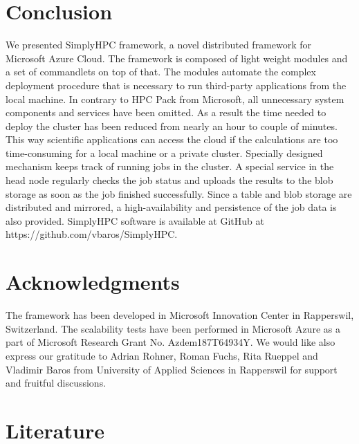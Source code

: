 \documentclass[3p,times]{elsarticle}
\begin{document}
 
\section{Conclusion}
\label{sec:conclusions}

We presented SimplyHPC framework, a novel distributed framework for Microsoft Azure Cloud. The framework is composed of light weight modules and a set of commandlets on top of that. The modules automate the complex deployment procedure that is necessary to run third-party applications from the local machine. In contrary to HPC Pack from Microsoft, all unnecessary system components and services have been omitted. As a result the time needed to deploy the cluster has been reduced from nearly an hour to couple of minutes.  This way scientific applications can access the cloud if the calculations are too time-consuming for a local machine or a private cluster. Specially designed mechanism keeps track of running jobs in the cluster. A special service in the head node regularly checks the job status and uploads the results to the blob storage as soon as the job finished successfully. Since a table and blob storage are distributed and mirrored, a high-availability and persistence of the job data is also provided. SimplyHPC software is available at GitHub at https://github.com/vbaros/SimplyHPC.



\section{Acknowledgments}
\label{sec:ackn}

The framework has been developed in Microsoft Innovation Center in Rapperswil, Switzerland. The scalability tests have been performed in Microsoft Azure as a part of Microsoft Research Grant No. Azdem187T64934Y. We would like also express our gratitude to Adrian Rohner, Roman Fuchs, Rita Rueppel and Vladimir Baros from University of Applied Sciences in Rapperswil for support and fruitful discussions.

\section{Literature}
\label{sec:literature}



\end{document}
